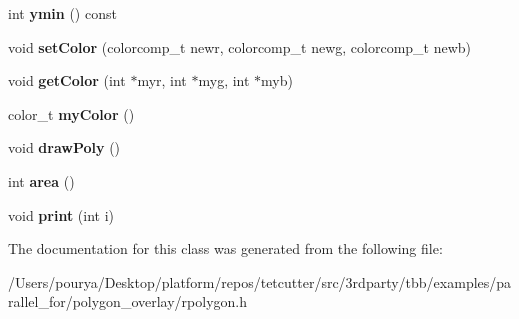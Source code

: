 \begin{DoxyCompactItemize}
\item 
\hypertarget{classRPolygon_a7123185110e496f24cd762bd92ec4c4c}{}int {\bfseries ymin} () const \label{classRPolygon_a7123185110e496f24cd762bd92ec4c4c}

\item 
\hypertarget{classRPolygon_ad48f79545fd5429ed3fae4a40b0987eb}{}void {\bfseries set\+Color} (colorcomp\+\_\+t newr, colorcomp\+\_\+t newg, colorcomp\+\_\+t newb)\label{classRPolygon_ad48f79545fd5429ed3fae4a40b0987eb}

\item 
\hypertarget{classRPolygon_ad3639c73eb8d7eec73d2528dee2c47fe}{}void {\bfseries get\+Color} (int $\ast$myr, int $\ast$myg, int $\ast$myb)\label{classRPolygon_ad3639c73eb8d7eec73d2528dee2c47fe}

\item 
\hypertarget{classRPolygon_aa4937433cbe5412ab59a1ff9eaaef3cc}{}color\+\_\+t {\bfseries my\+Color} ()\label{classRPolygon_aa4937433cbe5412ab59a1ff9eaaef3cc}

\item 
\hypertarget{classRPolygon_a4fb71027d8a8b200b2965c02b8abe4b6}{}void {\bfseries draw\+Poly} ()\label{classRPolygon_a4fb71027d8a8b200b2965c02b8abe4b6}

\item 
\hypertarget{classRPolygon_a065a6cdbeca40fe752634e3a5eb08d06}{}int {\bfseries area} ()\label{classRPolygon_a065a6cdbeca40fe752634e3a5eb08d06}

\item 
\hypertarget{classRPolygon_af8f6463d15c20e4a23dc1fb8aea2fc7d}{}void {\bfseries print} (int i)\label{classRPolygon_af8f6463d15c20e4a23dc1fb8aea2fc7d}

\end{DoxyCompactItemize}


The documentation for this class was generated from the following file\+:\begin{DoxyCompactItemize}
\item 
/\+Users/pourya/\+Desktop/platform/repos/tetcutter/src/3rdparty/tbb/examples/parallel\+\_\+for/polygon\+\_\+overlay/rpolygon.\+h\end{DoxyCompactItemize}
